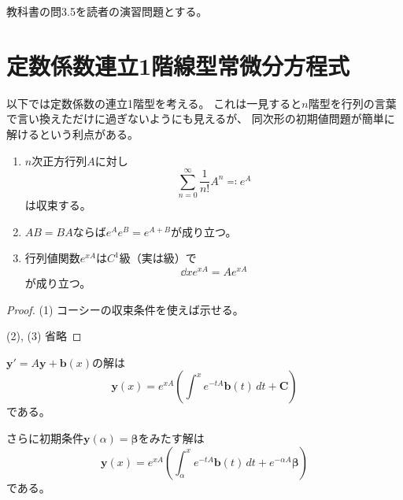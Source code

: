 \documentclass[report]{jlreq}
\begin{document}
\begin{problem}
    教科書の問3.5を読者の演習問題とする。
\end{problem}






\section{定数係数連立1階線型常微分方程式}

以下では定数係数の連立1階型を考える。
これは一見すると$n$階型を行列の言葉で言い換えただけに過ぎないようにも見えるが、
同次形の初期値問題が簡単に解けるという利点がある。

\begin{proposition}[3.3.1 行列の指数関数]
    \begin{enumerate}
        \item $n$次正方行列$A$に対し
            \begin{equation}
                \sum_{n=0}^\infty \frac{1}{n!} A^n \eqqcolon e^{A}
            \end{equation}
            は収束する。
        \item $AB = BA$ならば$e^A e^B = e^{A+B}$が成り立つ。
        \item 行列値関数$e^{xA}$は$C^1$級（実は{\smooth}級）で
            \begin{equation}
                \dd{x} e^{xA} = A e^{xA}
            \end{equation}
            が成り立つ。
    \end{enumerate}
\end{proposition}

\begin{proof}
    (1) コーシーの収束条件を使えば示せる。

    (2), (3) 省略
\end{proof}

\begin{theorem}[3.3.2 非同次形の一般解]
    $\bm{y}' = A\bm{y} + \bm{b}(x)$の解は
    \begin{equation}
        \bm{y}(x) = e^{xA} \left( \int^x e^{-tA} \bm{b}(t)\, dt + \bm{C} \right)
    \end{equation}
    である。
\end{theorem}

\begin{corollary}[3.3.3 非同次形の初期値問題]
    さらに初期条件$\bm{y}(\alpha) = \bm{\beta}$をみたす解は
    \begin{equation}
        \bm{y}(x) = e^{xA} \left( \int_\alpha^x e^{-tA} \bm{b}(t)\, dt + e^{-\alpha A} \bm{\beta} \right)
    \end{equation}
    である。
\end{corollary}
\end{document}
